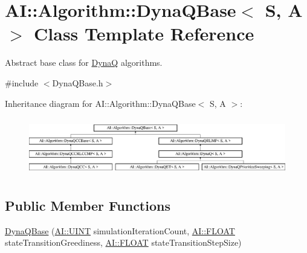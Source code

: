 \hypertarget{classAI_1_1Algorithm_1_1DynaQBase}{\section{A\-I\-:\-:Algorithm\-:\-:Dyna\-Q\-Base$<$ S, A $>$ Class Template Reference}
\label{classAI_1_1Algorithm_1_1DynaQBase}
}


Abstract base class for \hyperlink{classAI_1_1Algorithm_1_1DynaQ}{Dyna\-Q} algorithms.  




{\ttfamily \#include $<$Dyna\-Q\-Base.\-h$>$}

Inheritance diagram for A\-I\-:\-:Algorithm\-:\-:Dyna\-Q\-Base$<$ S, A $>$\-:\begin{figure}[H]
\begin{center}
\leavevmode
\includegraphics[height=2.557078cm]{classAI_1_1Algorithm_1_1DynaQBase}
\end{center}
\end{figure}
\subsection*{Public Member Functions}
\begin{DoxyCompactItemize}
\item 
\hyperlink{classAI_1_1Algorithm_1_1DynaQBase_a089f4024fab2f19179dea637b7f6c8ee}{Dyna\-Q\-Base} (\hyperlink{namespaceAI_ab6e14dc1e659854858a87e511f1439ec}{A\-I\-::\-U\-I\-N\-T} simulation\-Iteration\-Count, \hyperlink{namespaceAI_a41b74884a20833db653dded3918e05c3}{A\-I\-::\-F\-L\-O\-A\-T} state\-Transition\-Greediness, \hyperlink{namespaceAI_a41b74884a20833db653dded3918e05c3}{A\-I\-::\-F\-L\-O\-A\-T} state\-Transition\-Step\-Size)
\end{DoxyCompactItemize}
